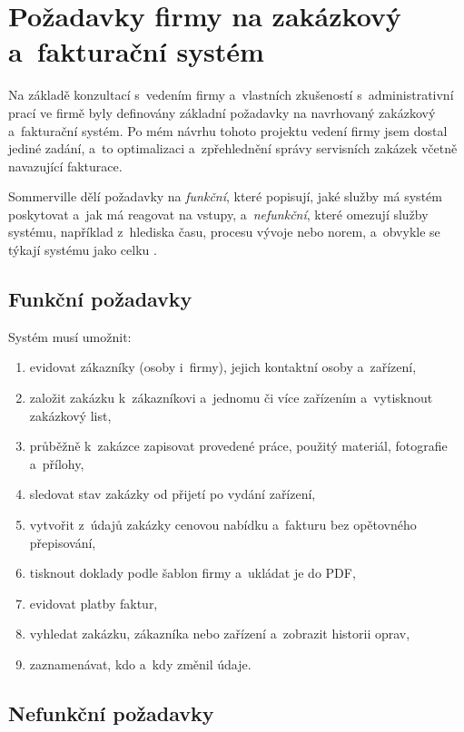 \section{Požadavky firmy na zakázkový a~fakturační systém}

Na základě konzultací s~vedením firmy a~vlastních zkušeností s~administrativní prací ve firmě byly definovány základní požadavky na navrhovaný zakázkový a~fakturační systém. Po mém návrhu tohoto projektu vedení firmy jsem dostal jediné zadání, a~to optimalizaci a~zpřehlednění správy servisních zakázek včetně navazující fakturace.

Sommerville dělí požadavky na \emph{funkční}, které popisují, jaké služby má systém poskytovat a~jak má reagovat na vstupy, a~\emph{nefunkční}, které omezují služby systému, například z~hlediska času, procesu vývoje nebo norem, a~obvykle se týkají systému jako celku \cite[s.~105]{Sommerville2016}.

\subsection{Funkční požadavky}

Systém musí umožnit:
\begin{enumerate}
\item evidovat zákazníky (osoby i~firmy), jejich kontaktní osoby a~zařízení,
\item založit zakázku k~zákazníkovi a~jednomu či více zařízením a~vytisknout zakázkový list,
\item průběžně k~zakázce zapisovat provedené práce, použitý materiál, fotografie a~přílohy,
\item sledovat stav zakázky od přijetí po vydání zařízení,
\item vytvořit z~údajů zakázky cenovou nabídku a~fakturu bez opětovného přepisování,
\item tisknout doklady podle šablon firmy a~ukládat je do PDF,
\item evidovat platby faktur,
\item vyhledat zakázku, zákazníka nebo zařízení a~zobrazit historii oprav,
\item zaznamenávat, kdo a~kdy změnil údaje.
\end{enumerate}

\subsection{Nefunkční požadavky}

